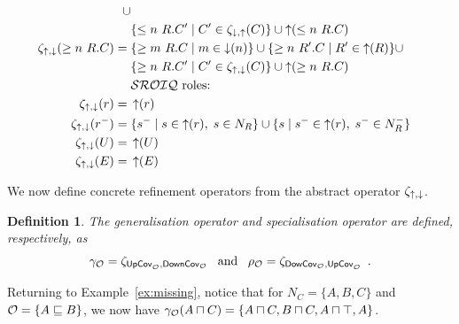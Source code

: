 \documentclass[
]{ceurart}
\newtheorem{definition}{Definition}
\begin{document}
\begin{table}[!t]
\begin{align*}
	\cup \\ 
	& \{ \less n R.C' \mid C' \in \zeta_{\corefine,\refine}(C) \} \cup 
	\refine(\less n R. C) \\
	\zeta_{\refine,\corefine}(\more n R. C) = {} & \{ \more m R.C \mid m \in \corefine(n) \} \cup 
	\{ \more n R'.C \mid R' \in \refine(R) \}
	\cup \\
	& \{ \more n R.C' \mid C' \in \zeta_{\refine,\corefine}(C) \}
	\cup 
	\refine(\more n R. C) \\
	& \text{\SROIQ roles:}\\
	\zeta_{\refine,\corefine}(r) = {} & \refine(r)\\ 
    \zeta_{\refine,\corefine}(r^-) = {} & 
    \{
    s^{-} \mid s \in \refine(r),\; s \in N_R
    \} \cup \{ s \mid
    s^{-} \in \refine(r),\; s^{-} \in N_R^-\}\\
	\zeta_{\refine,\corefine}(U) = {} & \refine(U)\\
	\zeta_{\refine,\corefine}(E) = {} & \refine(E) %
\end{align*}
\end{table}
%
\noindent
We now define  concrete refinement operators from the abstract operator $\zeta_{\mathop{\uparrow},\mathop{\downarrow}}$.
%
\begin{definition}\label{def:refinementoperators}
The \emph{generalisation operator} and \emph{specialisation operator} are defined, respectively, as 
\begin{equation*}
\gamma_\mathcal{O} = {}  \zeta_{\mathsf{UpCov}_{\mathcal{O}}, \mathsf{DownCov}_{\mathcal{O}}} \enspace \text{ and  } \enspace
\rho_\mathcal{O} = {}  \zeta_{\mathsf{DowCov}_{\mathcal{O}}, \mathsf{UpCov}_{\mathcal{O}}}\enspace . \end{equation*}
\end{definition}
%
\noindent Returning to Example~\ref{ex:missing}, notice that for  $N_C = \{A,B,C\}$ and
$\mathcal{O} = \{A \sqsubseteq B\}$, we now have $\gamma_\mathcal{O}(A \sqcap C) = \{A \sqcap C, B \sqcap C, A \sqcap \top,  A\}$.%
\end{document}
